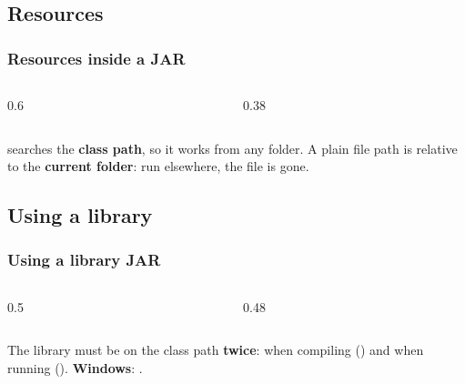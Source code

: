 \documentclass[aspectratio=169,10pt,compress]{beamer}
\newcommand{\win}{\textbf{Windows}}
\begin{document}
\subsection[Resources]{Resources}




\begin{frame}[t,fragile] \frametitle{Resources inside a JAR}
  \begin{columns}[T]
    \begin{column}{0.6\textwidth}
    \end{column}
    \begin{column}{0.38\textwidth}
    \end{column}
  \end{columns}

  \vspace{0.1em}
  \small {} searches the \textbf{class path}, so it works from any folder.
  A plain file path is relative to the \textbf{current folder}: run elsewhere, the file is gone.
\end{frame}

\subsection[Libraries]{Using a library}




\begin{frame}[t,fragile] \frametitle{Using a library JAR}
  \begin{columns}[T]
    \begin{column}{0.5\textwidth}
    \end{column}
    \begin{column}{0.48\textwidth}
    \end{column}
  \end{columns}
  \small The library must be on the class path \textbf{twice}: when compiling () and when running
  (). \win: .
\end{frame}
\end{document}
